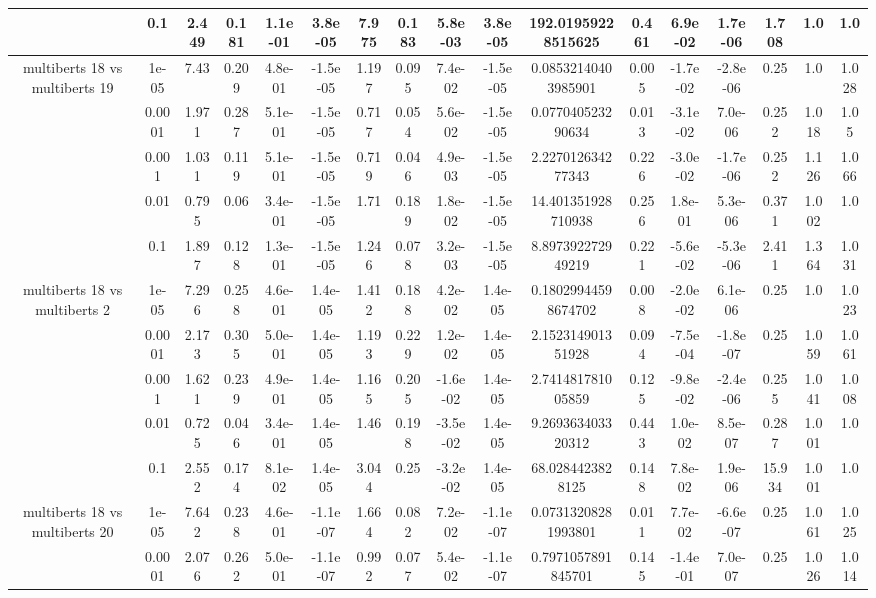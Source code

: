 \begin{tabular}{|c|c|c|c|c|c|c|c|c|c|c|c|c|c|c|c|c|}
 & 0.1 & 2.449 & 0.181 & 1.1e-01 & 3.8e-05 & 7.975 & 0.183 & 5.8e-03 & 3.8e-05 & 192.01959228515625 & 0.461 & 6.9e-02 & 1.7e-06 & 1.708 & 1.0 & 1.0 \\
\hline
\multirow{5}{*}{multiberts 18 vs multiberts 19} & 1e-05 & 7.43 & 0.209 & 4.8e-01 & -1.5e-05 & 1.197 & 0.095 & 7.4e-02 & -1.5e-05 & 0.08532140403985901 & 0.005 & -1.7e-02 & -2.8e-06 & 0.25 & 1.0 & 1.028 \\
 & 0.0001 & 1.971 & 0.287 & 5.1e-01 & -1.5e-05 & 0.717 & 0.054 & 5.6e-02 & -1.5e-05 & 0.077040523290634 & 0.013 & -3.1e-02 & 7.0e-06 & 0.252 & 1.018 & 1.05 \\
 & 0.001 & 1.031 & 0.119 & 5.1e-01 & -1.5e-05 & 0.719 & 0.046 & 4.9e-03 & -1.5e-05 & 2.227012634277343 & 0.226 & -3.0e-02 & -1.7e-06 & 0.252 & 1.126 & 1.066 \\
 & 0.01 & 0.795 & 0.06 & 3.4e-01 & -1.5e-05 & 1.71 & 0.189 & 1.8e-02 & -1.5e-05 & 14.401351928710938 & 0.256 & 1.8e-01 & 5.3e-06 & 0.371 & 1.002 & 1.0 \\
 & 0.1 & 1.897 & 0.128 & 1.3e-01 & -1.5e-05 & 1.246 & 0.078 & 3.2e-03 & -1.5e-05 & 8.897392272949219 & 0.221 & -5.6e-02 & -5.3e-06 & 2.411 & 1.364 & 1.031 \\
\hline
\multirow{5}{*}{multiberts 18 vs multiberts 2} & 1e-05 & 7.296 & 0.258 & 4.6e-01 & 1.4e-05 & 1.412 & 0.188 & 4.2e-02 & 1.4e-05 & 0.18029944598674702 & 0.008 & -2.0e-02 & 6.1e-06 & 0.25 & 1.0 & 1.023 \\
 & 0.0001 & 2.173 & 0.305 & 5.0e-01 & 1.4e-05 & 1.193 & 0.229 & 1.2e-02 & 1.4e-05 & 2.152314901351928 & 0.094 & -7.5e-04 & -1.8e-07 & 0.25 & 1.059 & 1.061 \\
 & 0.001 & 1.621 & 0.239 & 4.9e-01 & 1.4e-05 & 1.165 & 0.205 & -1.6e-02 & 1.4e-05 & 2.741481781005859 & 0.125 & -9.8e-02 & -2.4e-06 & 0.255 & 1.041 & 1.008 \\
 & 0.01 & 0.725 & 0.046 & 3.4e-01 & 1.4e-05 & 1.46 & 0.198 & -3.5e-02 & 1.4e-05 & 9.269363403320312 & 0.443 & 1.0e-02 & 8.5e-07 & 0.287 & 1.001 & 1.0 \\
 & 0.1 & 2.552 & 0.174 & 8.1e-02 & 1.4e-05 & 3.044 & 0.25 & -3.2e-02 & 1.4e-05 & 68.0284423828125 & 0.148 & 7.8e-02 & 1.9e-06 & 15.934 & 1.001 & 1.0 \\
\hline
\multirow{5}{*}{multiberts 18 vs multiberts 20} & 1e-05 & 7.642 & 0.238 & 4.6e-01 & -1.1e-07 & 1.664 & 0.082 & 7.2e-02 & -1.1e-07 & 0.07313208281993801 & 0.011 & 7.7e-02 & -6.6e-07 & 0.25 & 1.061 & 1.025 \\
 & 0.0001 & 2.076 & 0.262 & 5.0e-01 & -1.1e-07 & 0.992 & 0.077 & 5.4e-02 & -1.1e-07 & 0.7971057891845701 & 0.145 & -1.4e-01 & 7.0e-07 & 0.25 & 1.026 & 1.014 \\

\end{tabular}
